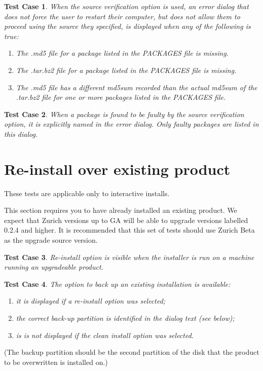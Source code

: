 \documentclass[a4paper]{article}
\newtheorem{testcase}{Test Case}
\begin{document}
\begin{testcase}
When the source verification option is used, an error dialog that does
not force the user to restart their computer, but does not allow them
to proceed using the source they specified, is displayed when any of
the following is true:
\begin{enumerate}
\item The .md5 file for a package listed in the PACKAGES file is
  missing.
\item The .tar.bz2 file for a package listed in the PACKAGES file is
  missing.
\item The .md5 file has a different md5sum recorded than the actual
  md5sum of the .tar.bz2 file for one or more packages listed in the
  PACKAGES file.
\end{enumerate}
\end{testcase}

\begin{testcase}
When a package is found to be faulty by the source verification
option, it is explicitly named in the error dialog.  Only faulty
packages are listed in this dialog.
\end{testcase}

\section{Re-install over existing product}

These tests are applicable only to interactive installs.

This section requires you to have already installed an existing
product.  We expect that Zurich versions up to GA will be able to
upgrade versions labelled 0.2.4 and higher.  It is recommended that
this set of tests should use Zurich Beta as the upgrade source version.

\begin{testcase}
Re-install option is visible when the installer is run on a machine
running an upgradeable product.
\end{testcase}

\begin{testcase}
The option to back up an existing installation is available:
\begin{enumerate}
\item it is displayed if a re-install option was selected;
\item the correct back-up partition is identified in the dialog text
  (see below);
\item is is not displayed if the clean install option was selected.
\end{enumerate}
\end{testcase}
(The backup partition should be the second partition of the disk that
the product to be overwritten is installed on.)
\end{document}
